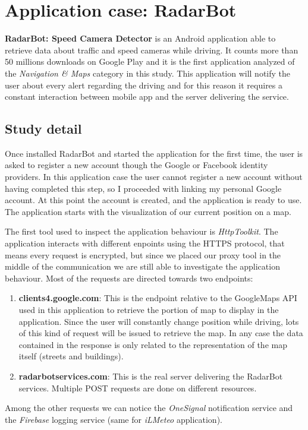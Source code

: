 \newpage
\section{Application case: RadarBot}
	\par \textbf{RadarBot: Speed Camera Detector } is an Android application able to retrieve data about traffic and speed cameras while driving. It counts more than 50 millions downloads on Google Play and it is the first application analyzed of the \textit{Navigation \& Maps} category in this study. This application will notify the user about every alert regarding the driving and for this reason it requires a constant interaction between mobile app and the server delivering the service. 
	
	\subsection{Study detail}
		\par Once installed RadarBot and started the application for the first time, the user is asked to register a new account though the Google or Facebook identity providers. In this application case the user cannot register a new account without having completed this step, so I proceeded with linking my personal Google account. At this point the account is created, and the application is ready to use. The application starts with the visualization of our current position on a map. \newline
		\par The first tool used to inspect the application behaviour is \textit{HttpToolkit}. The application interacts with different enpoints using the HTTPS protocol, that means every request is encrypted, but since we placed our proxy tool in the middle of the communication we are still able to investigate the application behaviour. Most of the requests are directed towards two endpoints:
		\begin{enumerate}
			\item \textbf{clients4.google.com}: This is the endpoint relative to the GoogleMaps API used in this application to retrieve the portion of map to display in the application. Since the user will constantly change position while driving, lots of this kind of request will be issued to retrieve the map. In any case the data contained in the response is only related to the representation of the map itself (streets and buildings).
			\item \textbf{radarbotservices.com}: This is the real server delivering the RadarBot services. Multiple POST requests are done on different resources.
		\end{enumerate}
		Among the other requests we can notice the \textit{OneSignal} notification service and the \textit{Firebase} logging service (same for \textit{iLMeteo} application).
		
